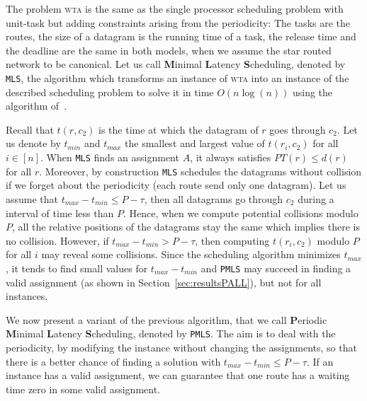 \documentclass[a4paper,10pt]{journal}
\newcommand\greedydeadline{\texttt{GreedyDeadline}\xspace}
\newcommand\MLS{\texttt{MLS}\xspace}
\newcommand\PMLS{\texttt{PMLS}\xspace}
\newcommand\wta{\textsc{wta}\xspace}
\begin{document}
     
     The problem \wta is the same as the single processor scheduling problem with unit-task but adding constraints arising from
     the periodicity: The tasks are the routes, the size of a datagram is the running time of a task, 
     the release time and the deadline are the same in both models, when we assume the star routed network to be canonical.
	 Let us call \textbf{M}inimal \textbf{L}atency \textbf{S}cheduling, denoted by \MLS, the algorithm which transforms an instance of \wta into an instance of the described scheduling problem to solve it in time $O(n\log(n))$ using the algorithm of~\cite{garey1981scheduling}.
     
     Recall that $t(r,c_2)$ is the time at which the datagram of $r$ goes through $c_2$. Let us denote by $t_{min}$ and $t_{max}$ the smallest and largest value of $t(r_i,c_2)$ for all $i \in[n]$. When \MLS finds an assignment $A$, it always satisfies $PT(r) \leq d(r)$ for all $r$. Moreover, by construction \MLS schedules the datagrams without collision if we forget about the periodicity (each route send only one datagram). Let us assume that $t_{max}- t_{min} \leq P -\tau $, then all datagrams go through $c_2$ during a interval of time less than $P$. Hence, when we compute potential collisions modulo $P$, all the relative positions of the datagrams stay the same which implies there is no collision. However, if $t_{max}- t_{min} > P -\tau $, then computing $t(r_i,c_2)$ modulo $P$ for all $i$ may reveal some collisions. Since the scheduling algorithm minimizes $t_{max}$, it tends to find  small values for $t_{max} - t_{min}$ and \PMLS may succeed in finding a valid assignment (as shown in Section~\ref{sec:resultsPALL}), but not for all instances. 
     
     We now present a variant of the previous algorithm, that we call
     \textbf{P}eriodic \textbf{M}inimal \textbf{L}atency \textbf{S}cheduling, denoted by \PMLS. The aim is to deal with the periodicity, by modifying the instance without changing the assignments, so that there is a better chance of finding a solution with $t_{max}- t_{min} \leq P -\tau $.  If an instance has a valid assignment, we can guarantee that one route has a waiting time zero in some valid assignment. 
     
\end{document}
